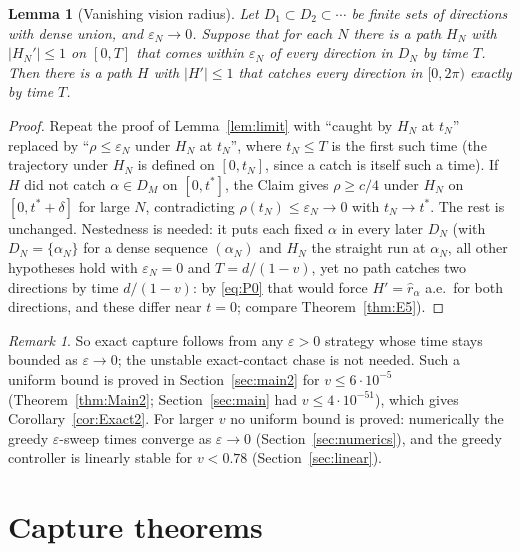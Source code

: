 \documentclass[11pt]{article}
\newtheorem{lemma}{Lemma}
\theoremstyle{remark}\newtheorem{remark}{Remark}
\newcommand{\rhat}{\hat r}
\begin{document}
\begin{lemma}[Vanishing vision radius]\label{lem:A41}
Let $D_1\subset D_2\subset\cdots$ be finite sets of directions with dense union, and $\varepsilon_N\to0$. Suppose that for each $N$ there is
a path $H_N$ with $|H_N'|\le1$ on $[0,T]$ that comes within $\varepsilon_N$ of every direction in $D_N$ by time $T$. Then there is a path $H$
with $|H'|\le1$ that catches every direction in $[0,2\pi)$ exactly by time $T$.
\end{lemma}
\begin{proof}
Repeat the proof of Lemma~\ref{lem:limit} with ``caught by $H_N$ at $t_N$'' replaced by ``$\rho\le\varepsilon_N$ under $H_N$ at $t_N$'', where $t_N\le T$ is the first such time (the
trajectory under $H_N$ is defined on $[0,t_N]$, since a catch is itself such a time). If $H$
did not catch $\alpha\in D_M$ on $[0,t^*]$, the Claim gives $\rho\ge c/4$ under $H_N$ on $[0,t^*+\delta]$ for large $N$, contradicting
$\rho(t_N)\le\varepsilon_N\to0$ with $t_N\to t^*$. The rest is unchanged. Nestedness is needed: it puts each fixed $\alpha$ in every later
$D_N$ (with $D_N=\{\alpha_N\}$ for a dense sequence $(\alpha_N)$ and $H_N$ the straight run at $\alpha_N$, all other hypotheses hold with $\varepsilon_N=0$ and $T=d/(1-v)$, yet no path catches two directions by time $d/(1-v)$: by \eqref{eq:P0} that would force $H'=\rhat_\alpha$ a.e.\ for both directions, and these differ near $t=0$; compare Theorem~\ref{thm:E5}).
\end{proof}
\begin{remark}
So exact capture follows from any $\varepsilon>0$ strategy whose time stays bounded as $\varepsilon\to0$; the unstable exact-contact chase is not
needed. Such a uniform bound is proved in Section~\ref{sec:main2} for $v\le6\cdot10^{-5}$ (Theorem~\ref{thm:Main2};
Section~\ref{sec:main} had $v\le4\cdot10^{-51}$), which gives Corollary~\ref{cor:Exact2}. For larger $v$ no uniform bound is proved: numerically the greedy $\varepsilon$-sweep times converge as
$\varepsilon\to0$ (Section~\ref{sec:numerics}), and the greedy controller is linearly stable for $v<0.78$
(Section~\ref{sec:linear}).
\end{remark}

\section{Capture theorems}
\end{document}
